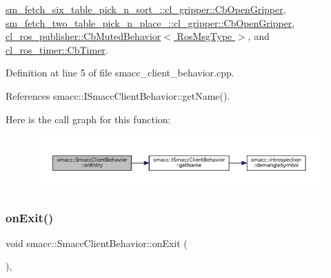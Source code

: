 \hyperlink{classsm__fetch__six__table__pick__n__sort__1_1_1cl__gripper_1_1CbOpenGripper_a78ac2d4b93c877f2f5786394b1e3afb6}{sm\+\_\+fetch\+\_\+six\+\_\+table\+\_\+pick\+\_\+n\+\_\+sort\+\_\+::cl\+\_\+gripper\+::\+Cb\+Open\+Gripper}, \hyperlink{classsm__fetch__two__table__pick__n__place__1_1_1cl__gripper_1_1CbOpenGripper_a08f95a8f05e33c1a04b77fa5f3465d78}{sm\+\_\+fetch\+\_\+two\+\_\+table\+\_\+pick\+\_\+n\+\_\+place\+\_\+::cl\+\_\+gripper\+::\+Cb\+Open\+Gripper}, \hyperlink{classcl__ros__publisher_1_1CbMutedBehavior_a79376d9160e3bd44678a2c0d89f1b4de}{cl\+\_\+ros\+\_\+publisher\+::\+Cb\+Muted\+Behavior$<$ Ros\+Msg\+Type $>$}, and \hyperlink{classcl__ros__timer_1_1CbTimer_aceba45e86271cf1b7333e2f42c246a38}{cl\+\_\+ros\+\_\+timer\+::\+Cb\+Timer}.



Definition at line 5 of file smacc\+\_\+client\+\_\+behavior.\+cpp.



References smacc\+::\+I\+Smacc\+Client\+Behavior\+::get\+Name().


Here is the call graph for this function\+:
\nopagebreak
\begin{figure}[H]
\begin{center}
\leavevmode
\includegraphics[width=350pt]{classsmacc_1_1SmaccClientBehavior_ad5d3e1f1697c3cfe66c94cadba948493_cgraph}
\end{center}
\end{figure}
\mbox{\label{classsmacc_1_1SmaccClientBehavior_a7e4fb6ce81ff96dc172425852d69c0c5}} 
\subsubsection{\texorpdfstring{on\+Exit()}{onExit()}}
{\footnotesize\ttfamily void smacc\+::\+Smacc\+Client\+Behavior\+::on\+Exit (\begin{DoxyParamCaption}{ }\end{DoxyParamCaption})\hspace{0.3cm}{\ttfamily [override]}, {\ttfamily [virtual]}}



